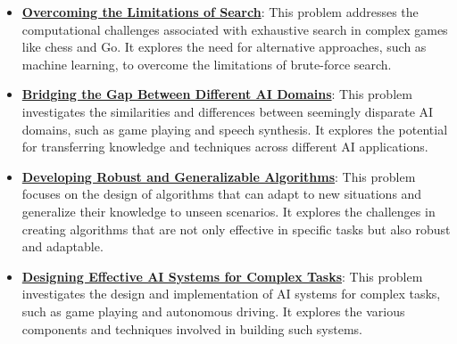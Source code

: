 \documentclass{article}%
\begin{document}
\begin{itemize}[leftmargin=*]%
\item \href{\url{https://purdue.brightspace.com/d2l/common/assets/pdfjs-d2l-dist/1.0.14-legacy/web/viewer.html?file=\%252Fcontent\%252Fenforced\%252F1095467-wl.202510.CS.24300.001\%252F02L2-Intro.pdf\%253Fou\%253D1095467\&lang=en-us\&container=d2l-fileviewer-rendered-pdf\&fullscreen=d2l-fileviewer-rendered-pdf-dialog\&height=667}#page=11}{\textbf{Overcoming the Limitations of Search}}: This problem addresses the computational challenges associated with exhaustive search in complex games like chess and Go. It explores the need for alternative approaches, such as machine learning, to overcome the limitations of brute-force search.%
\item \href{\url{https://purdue.brightspace.com/d2l/common/assets/pdfjs-d2l-dist/1.0.14-legacy/web/viewer.html?file=\%252Fcontent\%252Fenforced\%252F1095467-wl.202510.CS.24300.001\%252F02L2-Intro.pdf\%253Fou\%253D1095467\&lang=en-us\&container=d2l-fileviewer-rendered-pdf\&fullscreen=d2l-fileviewer-rendered-pdf-dialog\&height=667}#page=31}{\textbf{Bridging the Gap Between Different AI Domains}}: This problem investigates the similarities and differences between seemingly disparate AI domains, such as game playing and speech synthesis. It explores the potential for transferring knowledge and techniques across different AI applications.%
\item \href{\url{https://purdue.brightspace.com/d2l/common/assets/pdfjs-d2l-dist/1.0.14-legacy/web/viewer.html?file=\%252Fcontent\%252Fenforced\%252F1095467-wl.202510.CS.24300.001\%252F02L2-Intro.pdf\%253Fou\%253D1095467\&lang=en-us\&container=d2l-fileviewer-rendered-pdf\&fullscreen=d2l-fileviewer-rendered-pdf-dialog\&height=667}#page=36}{\textbf{Developing Robust and Generalizable Algorithms}}: This problem focuses on the design of algorithms that can adapt to new situations and generalize their knowledge to unseen scenarios. It explores the challenges in creating algorithms that are not only effective in specific tasks but also robust and adaptable.%
\item \href{\url{https://purdue.brightspace.com/d2l/common/assets/pdfjs-d2l-dist/1.0.14-legacy/web/viewer.html?file=\%252Fcontent\%252Fenforced\%252F1095467-wl.202510.CS.24300.001\%252F02L2-Intro.pdf\%253Fou\%253D1095467\&lang=en-us\&container=d2l-fileviewer-rendered-pdf\&fullscreen=d2l-fileviewer-rendered-pdf-dialog\&height=667}#page=47}{\textbf{Designing Effective AI Systems for Complex Tasks}}: This problem investigates the design and implementation of AI systems for complex tasks, such as game playing and autonomous driving. It explores the various components and techniques involved in building such systems.%
\end{itemize}
\end{document}
